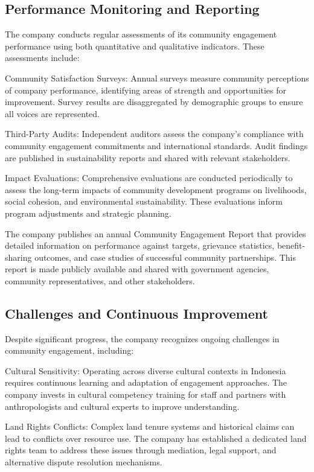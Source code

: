 \subsection{Performance Monitoring and Reporting}

The company conducts regular assessments of its community engagement performance using both quantitative and qualitative indicators. These assessments include:

Community Satisfaction Surveys: Annual surveys measure community perceptions of company performance, identifying areas of strength and opportunities for improvement. Survey results are disaggregated by demographic groups to ensure all voices are represented.

Third-Party Audits: Independent auditors assess the company's compliance with community engagement commitments and international standards. Audit findings are published in sustainability reports and shared with relevant stakeholders.

Impact Evaluations: Comprehensive evaluations are conducted periodically to assess the long-term impacts of community development programs on livelihoods, social cohesion, and environmental sustainability. These evaluations inform program adjustments and strategic planning.

The company publishes an annual Community Engagement Report that provides detailed information on performance against targets, grievance statistics, benefit-sharing outcomes, and case studies of successful community partnerships. This report is made publicly available and shared with government agencies, community representatives, and other stakeholders.

\subsection{Challenges and Continuous Improvement}

Despite significant progress, the company recognizes ongoing challenges in community engagement, including:

Cultural Sensitivity: Operating across diverse cultural contexts in Indonesia requires continuous learning and adaptation of engagement approaches. The company invests in cultural competency training for staff and partners with anthropologists and cultural experts to improve understanding.

Land Rights Conflicts: Complex land tenure systems and historical claims can lead to conflicts over resource use. The company has established a dedicated land rights team to address these issues through mediation, legal support, and alternative dispute resolution mechanisms.

